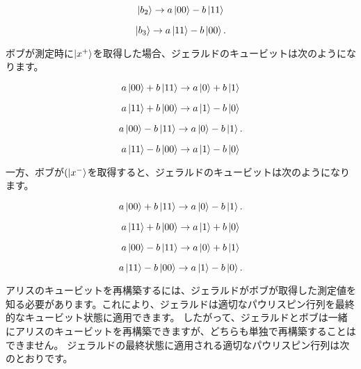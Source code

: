\begin{equation}
\label{218}
\ket{b_2}
\to
a \ket{00} - b \ket{11}
\end{equation}

\begin{equation}
\label{219}
\ket{b_3}
\to
a \ket{11} - b \ket{00}.
\end{equation}

ボブが測定時に$\ket{x^+}$を取得した場合、ジェラルドのキュービットは次のようになります。


\begin{equation}
\label{220}
a\ket{00} + b\ket{11}
\to
a \ket{0} + b \ket{1}
\end{equation}

\begin{equation}
\label{221}
a\ket{11} + b\ket{00}
\to
a \ket{1} - b \ket{0}
\end{equation}

\begin{equation}
\label{222}
a\ket{00} - b\ket{11}
\to
a \ket{0} - b \ket{1}.
\end{equation}

\begin{equation}
\label{223}
a\ket{11} - b\ket{00}
\to
a \ket{1} - b \ket{0}
\end{equation}

一方、ボブが$(\ket{x^-}$を取得すると、ジェラルドのキュービットは次のようになります。


\begin{equation}
\label{224}
a\ket{00} + b\ket{11}
\to
a \ket{0} - b \ket{1}.
\end{equation}

\begin{equation}
\label{225}
a\ket{11} + b\ket{00}
\to
a \ket{1} + b \ket{0}
\end{equation}

\begin{equation}
\label{226}
a\ket{00} - b\ket{11}
\to
a \ket{0} + b \ket{1}
\end{equation}

\begin{equation}
\label{227}
a\ket{11} - b\ket{00}
\to
a \ket{1} - b \ket{0}.
\end{equation}


アリスのキュービットを再構築するには、ジェラルドがボブが取得した測定値を知る必要があります。これにより、ジェラルドは適切なパウリスピン行列を最終的なキュービット状態に適用できます。
したがって、ジェラルドとボブは一緒にアリスのキュービットを再構築できますが、どちらも単独で再構築することはできません。 ジェラルドの最終状態に適用される適切なパウリスピン行列は次のとおりです。

